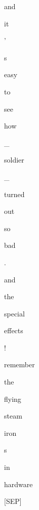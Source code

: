 \documentclass[varwidth=150mm]{standalone}
\begin{document}
\begin{CJK*}{UTF8}{gbsn}
{{{\colorbox{red!8.969535827636719}{\strut and} \colorbox{red!0.0}{\strut it} \colorbox{red!0.0}{\strut '} \colorbox{red!2.5430760383605957}{\strut s} \colorbox{red!0.0}{\strut easy} \colorbox{red!1.0445294380187988}{\strut to} \colorbox{red!0.0}{\strut see} \colorbox{red!1.0233570337295532}{\strut how} \colorbox{red!16.335840225219727}{\strut \_} \colorbox{red!23.267427444458008}{\strut soldier} \colorbox{red!37.79165267944336}{\strut \_} \colorbox{red!0.0}{\strut turned} \colorbox{red!0.0}{\strut out} \colorbox{red!1.6720830202102661}{\strut so} \colorbox{red!3.0401999950408936}{\strut bad} \colorbox{red!0.0}{\strut .} \colorbox{red!4.8567023277282715}{\strut and} \colorbox{red!2.3439669609069824}{\strut the} \colorbox{red!2.5501291751861572}{\strut special} \colorbox{red!3.231907606124878}{\strut effects} \colorbox{red!19.14178466796875}{\strut !} \colorbox{red!7.028682708740234}{\strut remember} \colorbox{red!7.501473426818848}{\strut the} \colorbox{red!24.9321346282959}{\strut flying} \colorbox{red!5.930625915527344}{\strut steam} \colorbox{red!2.6567375659942627}{\strut iron}\colorbox{red!3.1683950424194336}{\strut s} \colorbox{red!12.808701515197754}{\strut in} \colorbox{red!48.6471061706543}{\strut hardware} \colorbox{red!5.06306266784668}{\strut [SEP]}
}}}
\end{CJK*}
\end{document}
